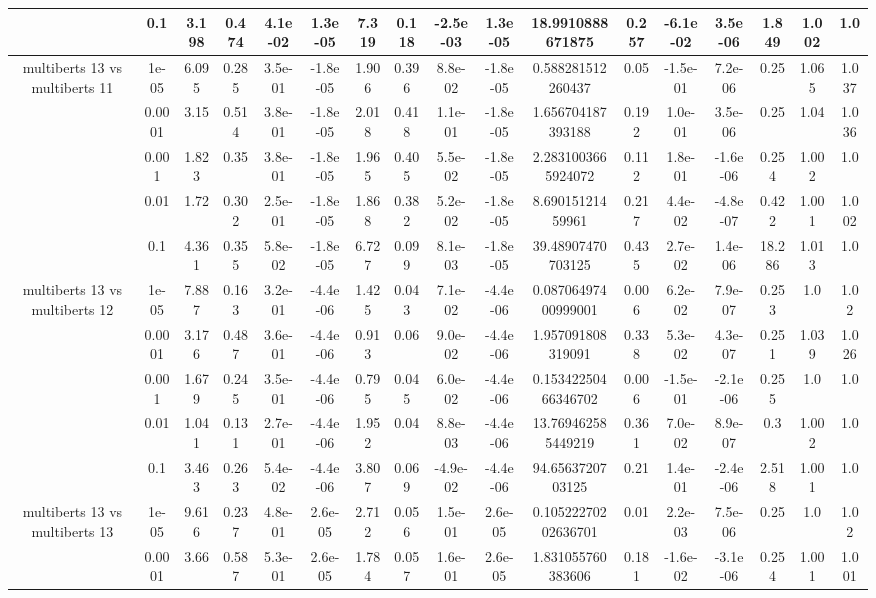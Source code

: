 \begin{tabular}{|c|c|c|c|c|c|c|c|c|c|c|c|c|c|c|c|c|}
 & 0.1 & 3.198 & 0.474 & 4.1e-02 & 1.3e-05 & 7.319 & 0.118 & -2.5e-03 & 1.3e-05 & 18.9910888671875 & 0.257 & -6.1e-02 & 3.5e-06 & 1.849 & 1.002 & 1.0 \\
\hline
\multirow{5}{*}{multiberts 13 vs multiberts 11} & 1e-05 & 6.095 & 0.285 & 3.5e-01 & -1.8e-05 & 1.906 & 0.396 & 8.8e-02 & -1.8e-05 & 0.588281512260437 & 0.05 & -1.5e-01 & 7.2e-06 & 0.25 & 1.065 & 1.037 \\
 & 0.0001 & 3.15 & 0.514 & 3.8e-01 & -1.8e-05 & 2.018 & 0.418 & 1.1e-01 & -1.8e-05 & 1.656704187393188 & 0.192 & 1.0e-01 & 3.5e-06 & 0.25 & 1.04 & 1.036 \\
 & 0.001 & 1.823 & 0.35 & 3.8e-01 & -1.8e-05 & 1.965 & 0.405 & 5.5e-02 & -1.8e-05 & 2.2831003665924072 & 0.112 & 1.8e-01 & -1.6e-06 & 0.254 & 1.002 & 1.0 \\
 & 0.01 & 1.72 & 0.302 & 2.5e-01 & -1.8e-05 & 1.868 & 0.382 & 5.2e-02 & -1.8e-05 & 8.69015121459961 & 0.217 & 4.4e-02 & -4.8e-07 & 0.422 & 1.001 & 1.002 \\
 & 0.1 & 4.361 & 0.355 & 5.8e-02 & -1.8e-05 & 6.727 & 0.099 & 8.1e-03 & -1.8e-05 & 39.48907470703125 & 0.435 & 2.7e-02 & 1.4e-06 & 18.286 & 1.013 & 1.0 \\
\hline
\multirow{5}{*}{multiberts 13 vs multiberts 12} & 1e-05 & 7.887 & 0.163 & 3.2e-01 & -4.4e-06 & 1.425 & 0.043 & 7.1e-02 & -4.4e-06 & 0.08706497400999001 & 0.006 & 6.2e-02 & 7.9e-07 & 0.253 & 1.0 & 1.02 \\
 & 0.0001 & 3.176 & 0.487 & 3.6e-01 & -4.4e-06 & 0.913 & 0.06 & 9.0e-02 & -4.4e-06 & 1.957091808319091 & 0.338 & 5.3e-02 & 4.3e-07 & 0.251 & 1.039 & 1.026 \\
 & 0.001 & 1.679 & 0.245 & 3.5e-01 & -4.4e-06 & 0.795 & 0.045 & 6.0e-02 & -4.4e-06 & 0.15342250466346702 & 0.006 & -1.5e-01 & -2.1e-06 & 0.255 & 1.0 & 1.0 \\
 & 0.01 & 1.041 & 0.131 & 2.7e-01 & -4.4e-06 & 1.952 & 0.04 & 8.8e-03 & -4.4e-06 & 13.769462585449219 & 0.361 & 7.0e-02 & 8.9e-07 & 0.3 & 1.002 & 1.0 \\
 & 0.1 & 3.463 & 0.263 & 5.4e-02 & -4.4e-06 & 3.807 & 0.069 & -4.9e-02 & -4.4e-06 & 94.6563720703125 & 0.21 & 1.4e-01 & -2.4e-06 & 2.518 & 1.001 & 1.0 \\
\hline
\multirow{5}{*}{multiberts 13 vs multiberts 13} & 1e-05 & 9.616 & 0.237 & 4.8e-01 & 2.6e-05 & 2.712 & 0.056 & 1.5e-01 & 2.6e-05 & 0.10522270202636701 & 0.01 & 2.2e-03 & 7.5e-06 & 0.25 & 1.0 & 1.02 \\
 & 0.0001 & 3.66 & 0.587 & 5.3e-01 & 2.6e-05 & 1.784 & 0.057 & 1.6e-01 & 2.6e-05 & 1.831055760383606 & 0.181 & -1.6e-02 & -3.1e-06 & 0.254 & 1.001 & 1.001 \\

\end{tabular}
